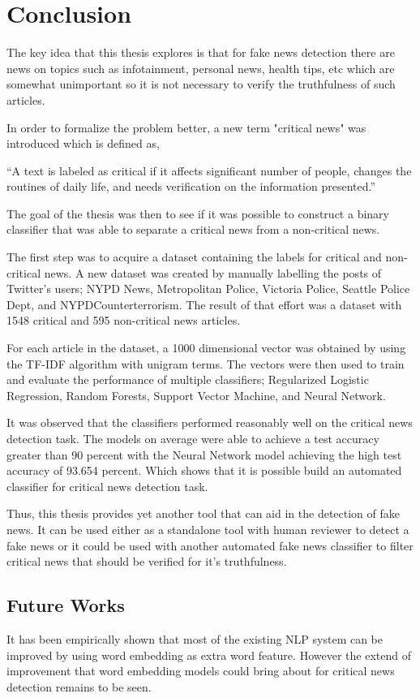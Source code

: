 \chapter{Conclusion}\label{conclusion}
The key idea that this thesis explores is that for fake news detection there are news on topics such as infotainment, personal news, health tips, etc which are somewhat unimportant so it is not necessary to verify the truthfulness of such articles.

In order to formalize the problem better, a new term "critical news" was introduced which is defined as,

\enquote{A text is labeled as critical if it affects significant number of people, changes the routines of daily life, and needs verification on the information presented.}

The goal of the thesis was then to see if it was possible to construct a binary classifier that was able to separate a critical news from a non-critical news.

The first step was to acquire a dataset containing the labels for critical and non-critical news. A new dataset was created by manually labelling the posts of Twitter's users; NYPD News, Metropolitan Police, Victoria Police, Seattle Police Dept, and NYPDCounterterrorism. The result of that effort was a dataset with 1548 critical and 595 non-critical news articles.

For each article in the dataset, a 1000 dimensional vector was obtained by using the TF-IDF algorithm with unigram terms. The vectors were then used to train and evaluate the performance of multiple classifiers; Regularized Logistic Regression, Random Forests, Support Vector Machine, and Neural Network.

It was observed that the classifiers performed reasonably well on the critical news detection task. The models on average were able to achieve a test accuracy greater than 90 percent with the Neural Network model achieving the high test accuracy of 93.654 percent. Which shows that it is possible build an automated classifier for critical news detection task.

Thus, this thesis provides yet another tool that can aid in the detection of fake news. It can be used either as a standalone tool with human reviewer to detect a fake news or it could be used with another automated fake news classifier to filter critical news that should be verified for it's truthfulness.

\section{Future Works}
It has been empirically shown that most of the existing NLP system can be improved by using word embedding as extra word feature\cite{turian2010word}. However the extend of improvement that word embedding models could bring about for critical news detection remains to be seen.

